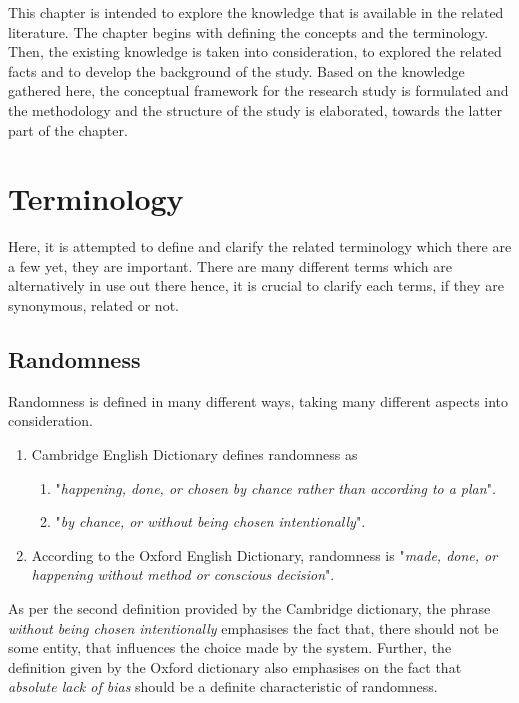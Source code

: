 This chapter is intended to explore the knowledge that is available in the related literature. The chapter begins with defining the concepts and the terminology. Then, the existing knowledge is taken into consideration, to explored the related facts and to develop the background of the study. Based on the knowledge gathered here, the conceptual framework for the research study is formulated and the methodology and the structure of the study is elaborated, towards the latter part of the chapter.

\section{Terminology}

Here, it is attempted to define and clarify the related terminology which there are a few yet, they are important. There are many different terms which are alternatively in use out there hence, it is crucial to clarify each terms, if they are synonymous, related or not.

\subsection{Randomness}\label{lbl_randomness}

Randomness is defined in many different ways, taking many different aspects into consideration. 
\begin{enumerate}
    \item Cambridge English Dictionary defines randomness as 
    \begin{enumerate}
        \item  "\textit{happening, done, or chosen by chance rather than according to a plan}"\cite{web_cambridge_def_rnd}.
        \item "\textit{by chance, or without being chosen intentionally}"\cite{web_cambridge_def_rnd}.
    \end{enumerate}
    \item According to the Oxford English Dictionary, randomness is "\textit{made, done, or happening without method or conscious decision}"\cite{web_oxford_def_rnd}.
\end{enumerate}

As per the second definition provided by the Cambridge dictionary, the phrase \textit{without being chosen intentionally} emphasises the fact that, there should not be some entity, that influences the choice made by the system. Further, the definition given by the Oxford dictionary also emphasises on the fact that \textit{absolute lack of bias} should be a definite characteristic of randomness.

